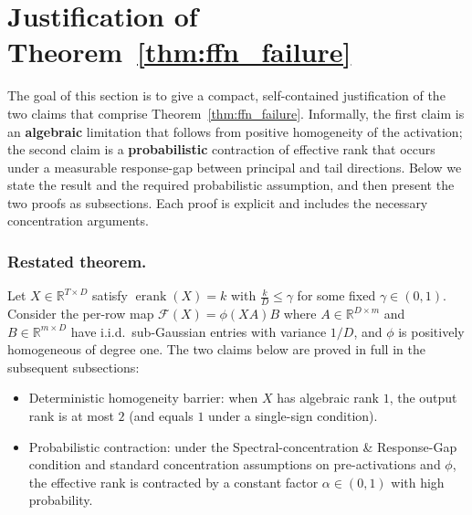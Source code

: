 \documentclass[sigconf,screen]{acmart}
\begin{document}
\section{Justification of Theorem~\ref{thm:ffn_failure}}
\label{app:thm:ffn_failure}

The goal of this section is to give a compact, self-contained justification of the two claims that comprise Theorem~\ref{thm:ffn_failure}. Informally, the first claim is an \textbf{algebraic} limitation that follows from positive homogeneity of the activation; the second claim is a \textbf{probabilistic} contraction of effective rank that occurs under a measurable response-gap between principal and tail directions. Below we state the result and the required probabilistic assumption, and then present the two proofs as subsections. Each proof is explicit and includes the necessary concentration arguments.

\subsubsection*{\bf Restated theorem.}
Let \(X\in\mathbb R^{T\times D}\) satisfy \(\operatorname{erank}(X)=k\) with \(\tfrac{k}{D}\le\gamma\) for some fixed \(\gamma\in(0,1)\). Consider the per-row map \(\mathcal F(X)=\phi(XA)B\) where \(A\in\mathbb R^{D\times m}\) and \(B\in\mathbb R^{m\times D}\) have i.i.d.\ sub-Gaussian entries with variance \(1/D\), and \(\phi\) is positively homogeneous of degree one. The two claims below are proved in full in the subsequent subsections:

\begin{itemize}[leftmargin=15pt,parsep=2pt,itemsep=2pt,topsep=2pt]
  \item Deterministic homogeneity barrier: when \(X\) has algebraic rank \(1\), the output rank is at most \(2\) (and equals \(1\) under a single-sign condition).
  \item Probabilistic contraction: under the Spectral-concentration \& Response-Gap condition and standard concentration assumptions on pre-activations and \(\phi\), the effective rank is contracted by a constant factor \(\alpha\in(0,1)\) with high probability.
\end{itemize}
\end{document}
